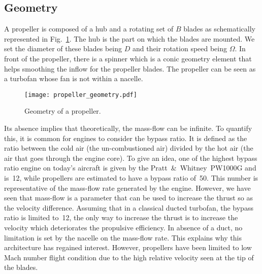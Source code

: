 
\subsection{Geometry}
\label{sub:cror_propeller_geometry}

A propeller is composed of a hub and a rotating set of 
$B$ blades as schematically represented in
Fig.~\ref{fig:cror_propeller_geometry}. The hub
is the part on which the blades are mounted.
We set the diameter of these blades being $D$
and their rotation speed being $\Omega$. 
In front of the propeller, there is a spinner which is
a conic geometry element that helps
smoothing the inflow for the propeller blades.
The propeller can be seen as
a turbofan whose fan is not within a nacelle.
\begin{figure}
  \centering
  \texttt{[image: propeller\_geometry.pdf]}
  \caption{Geometry of a propeller.}
  \label{fig:cror_propeller_geometry}
\end{figure}
Its absence implies that theoretically, the mass-flow can be
infinite. To quantify this, it is common for engines to
consider the bypass ratio. It is defined as the ratio between the
cold air (the un-combustioned air)
divided by the hot air (the air that goes through the engine core).
To give an idea, one of the highest bypass ratio engine on today's aircraft is given
by the Pratt~\&~Whitney~PW1000G and is~12, while propellers are estimated
to have a bypass ratio of~50. 
This number is representative of the mass-flow rate generated by the engine.
However, we have seen that mass-flow is a parameter that can be used to increase
the thrust so as the velocity difference. Assuming that in a classical ducted turbofan, 
the bypass ratio is limited to~12, the only
way to increase the thrust is to increase the 
velocity which deteriorates the propulsive efficiency. In absence of a duct,
no limitation is set by the nacelle on the mass-flow rate.
This explains why this architecture has
regained interest. However, propellers
have been limited to low Mach number flight condition
due to the high relative velocity seen at the tip of the blades.

